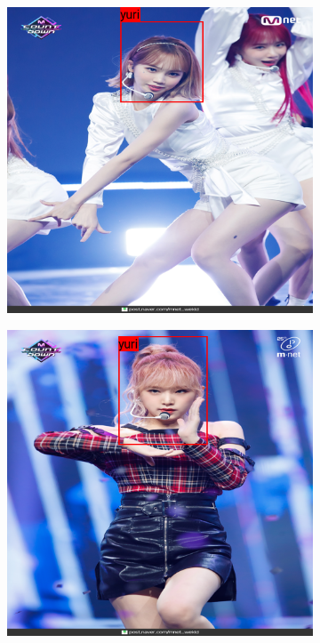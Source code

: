 \begin{figure}[htbp]
    \vspace{2mm}
    \begin{subfigure}[b]{0.32\textwidth}
        \centering
        \includegraphics[width=\textwidth]{images/introduction/chaewon-incorrect.png}
    \end{subfigure}
    \hfill
    \begin{subfigure}[b]{0.32\textwidth}
        \centering
        \includegraphics[width=\textwidth]{images/introduction/yena-incorrect.png}

\end{subfigure}
\end{figure}

